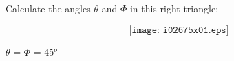 

Calculate the angles $\theta$ and $\Phi$ in this right triangle:

$$\texttt{[image: i02675x01.eps]}$$







$\theta$ = $\Phi$ = 45$^{o}$
 










